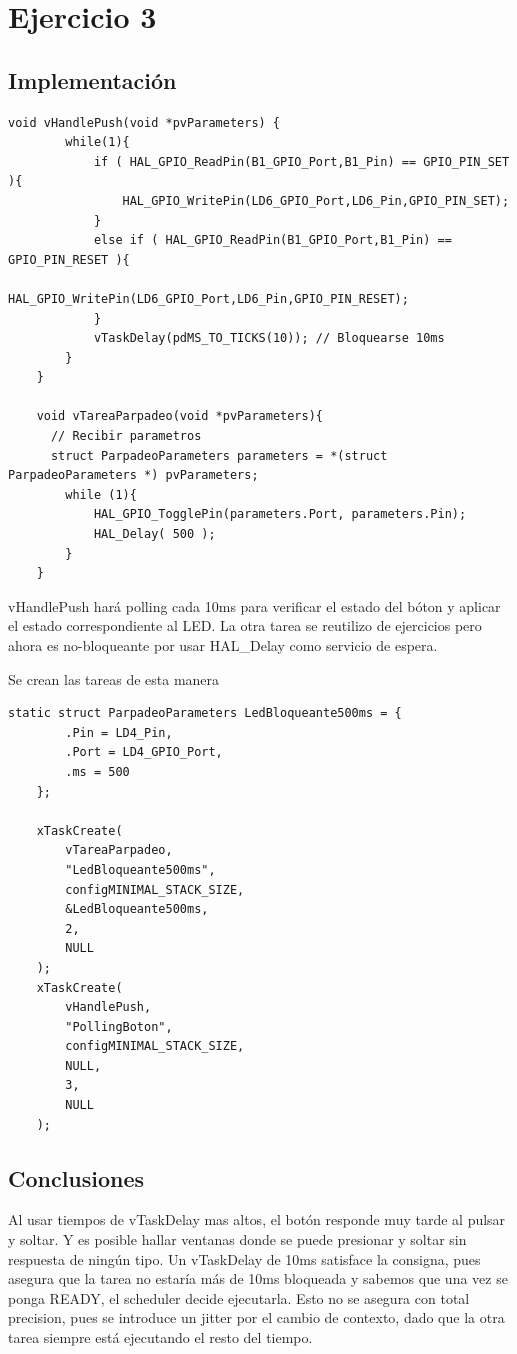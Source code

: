 \documentclass[12pt]{article}
\begin{document}
\section{Ejercicio 3}
\subsection{Implementación}
\begin{lstlisting}[style=CStyle]
    void vHandlePush(void *pvParameters) {
        while(1){
            if ( HAL_GPIO_ReadPin(B1_GPIO_Port,B1_Pin) == GPIO_PIN_SET ){
                HAL_GPIO_WritePin(LD6_GPIO_Port,LD6_Pin,GPIO_PIN_SET);
            }
            else if ( HAL_GPIO_ReadPin(B1_GPIO_Port,B1_Pin) == GPIO_PIN_RESET ){
                HAL_GPIO_WritePin(LD6_GPIO_Port,LD6_Pin,GPIO_PIN_RESET);
            }
            vTaskDelay(pdMS_TO_TICKS(10)); // Bloquearse 10ms
        }
    }
    
    void vTareaParpadeo(void *pvParameters){
      // Recibir parametros
      struct ParpadeoParameters parameters = *(struct ParpadeoParameters *) pvParameters;
        while (1){
            HAL_GPIO_TogglePin(parameters.Port, parameters.Pin);
            HAL_Delay( 500 );
        }
    }
\end{lstlisting}
vHandlePush hará polling cada 10ms para verificar
el estado del bóton y aplicar el estado correspondiente al LED.
La otra tarea se reutilizo de ejercicios pero ahora es no-bloqueante 
por usar HAL\_Delay como servicio de espera.

\pagebreak
Se crean las tareas de esta manera
\begin{lstlisting}[style=CStyle]
    static struct ParpadeoParameters LedBloqueante500ms = {
        .Pin = LD4_Pin,
        .Port = LD4_GPIO_Port,
        .ms = 500
    };
  
    xTaskCreate(
        vTareaParpadeo,
        "LedBloqueante500ms",
        configMINIMAL_STACK_SIZE,
        &LedBloqueante500ms,
        2,
        NULL
    );
    xTaskCreate(
        vHandlePush,
        "PollingBoton",
        configMINIMAL_STACK_SIZE,
        NULL,
        3,
        NULL
    );
\end{lstlisting}
\subsection{Conclusiones}
Al usar tiempos de vTaskDelay mas altos, el botón responde muy 
tarde al pulsar y soltar. Y es posible hallar ventanas
donde se puede presionar y soltar sin respuesta de ningún tipo.
Un vTaskDelay de 10ms satisface la consigna, pues asegura que 
la tarea no estaría más de 10ms bloqueada y sabemos 
que una vez se ponga READY, el scheduler decide ejecutarla.
Esto no se asegura con total precision, pues se introduce un jitter
por el cambio de contexto, dado que la otra tarea siempre está ejecutando
el resto del tiempo.
\end{document}

